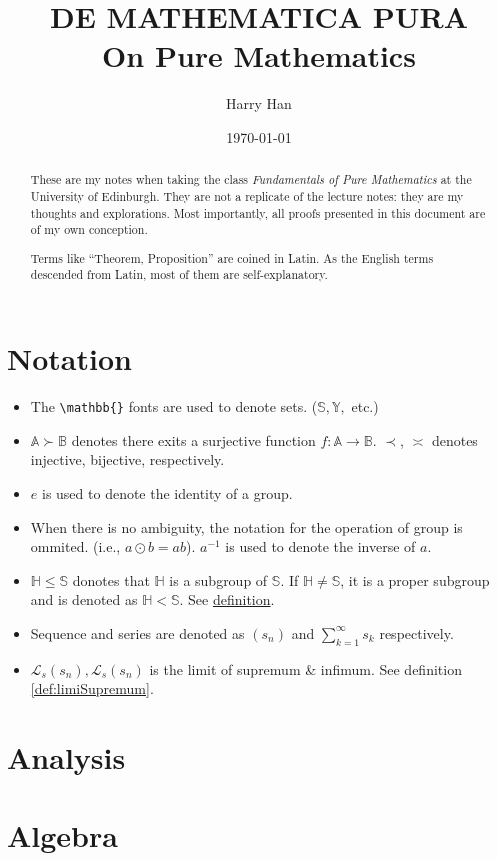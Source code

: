 \documentclass[12pt, a4paper]{report}
\title{
	DE MATHEMATICA PURA \\
	\large On Pure Mathematics
}
\author{Harry Han}
\date{\today}
\theoremstyle{definition}
\theoremstyle{definition}
\theoremstyle{remark}
\begin{document}
\maketitle
\tableofcontents

\newpage

\begin{abstract}
	These are my notes when taking the class \emph{Fundamentals of Pure Mathematics} at the University of Edinburgh. They are not a replicate of the lecture notes: they are my thoughts and explorations. 
	Most importantly, all proofs presented in this document are of my own conception. 

	Terms like ``Theorem, Proposition'' are coined in Latin. As the English terms descended from Latin, most of them are self-explanatory. 
\end{abstract}
\chapter{Notation}
\begin{itemize}
	\item The \verb|\mathbb{}| fonts are used to denote sets. ($\mathbb{S}, \mathbb{Y},$ etc.)
	\item $\mathbb{A} \succ \mathbb{B}$ denotes there exits a surjective function $f:\mathbb{A}\rightarrow \mathbb{B}$. $\prec$, $\asymp$ denotes injective, bijective, respectively.
	\item $e$ is used to denote the identity of a group.
	\item When there is no ambiguity, the notation for the operation of group is ommited. (i.e., $a \odot b = ab$).
		$a^{-1}$ is used to denote the inverse of $a$.
	\item $\mathbb{H}\leq \mathbb{S}$ donotes that $\mathbb{H}$ is a subgroup of $\mathbb{S}$. If $\mathbb{H}\neq \mathbb{S}$, it is a proper subgroup and is denoted as $\mathbb{H}<\mathbb{S}$. See \hyperlink{def:subgroup}{definition}.
	\item Sequence and series are denoted as $(s_n)$ and $\sum^{\infty}_{k=1}s_k$ respectively.
	\item $\mathcal{L}_s(s_n), \mathcal{L}_s(s_n)$ is the limit of supremum \& infimum. See definition \ref{def:limiSupremum}.

\end{itemize}

\chapter{Analysis}






\chapter{Algebra}





\appendix


\printbibliography
\end{document}
